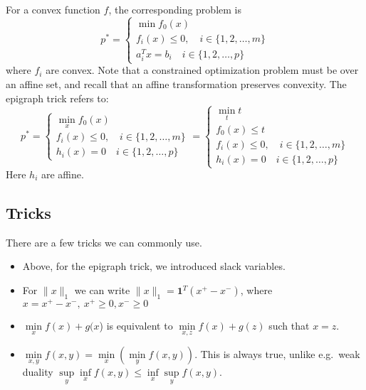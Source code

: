 \documentclass[english, 11pt]{article}
\begin{document}
For a convex function $f$, the corresponding problem is 
\[
p^* =\begin{cases} \min f_0(x)  \\
f_i(x) \le 0, \quad i \in \{1,2,\dots,m\} \\
a_i^T x = b_i \quad i \in \{1,2,\dots,p\}
\end{cases}
\]
where $f_i$ are convex. Note that a constrained optimization problem must be over an affine set, and recall that an affine transformation preserves convexity. 
The epigraph trick refers to:
\[
p^* =\begin{cases} \min \limits_x f_0(x)  \\
f_i(x) \le 0, \quad i \in \{1,2,\dots,m\} \\
h_i(x) =0 \quad i \in \{1,2,\dots,p\}
\end{cases}
= 
\begin{cases} \min \limits_t t\\
f_0(x) \le t \\
f_i(x) \le 0, \quad i \in \{1,2,\dots,m\} \\
h_i(x) =0 \quad i \in \{1,2,\dots,p\}
\end{cases}
\]
Here $h_i$ are affine.

\subsection{Tricks}
There are a few tricks we can commonly use. 

\begin{itemize}
\item Above, for the epigraph trick, we introduced slack variables.

\item For $\|x\|_1$ we can write $\|x\|_1 = \mathbf{1}^T (x^+ - x^-)$, where $x= x^+ - x^-, \ x^+ \ge 0, x^- \ge 0$

\item $\min \limits_x f(x) + g(x$) is equivalent to $\min \limits_{x,z} f(x) + g(z)$ such that $x=z$.

\item $\min \limits_{x,y} f(x,y) = \min \limits_x \left( \min \limits_y f(x,y) \right)$. This is always true, unlike e.g.\ weak duality $\sup \limits_y \inf \limits_x f(x,y) \le \inf \limits_x \sup \limits_y f(x,y)$.

\end{itemize}
\end{document}
